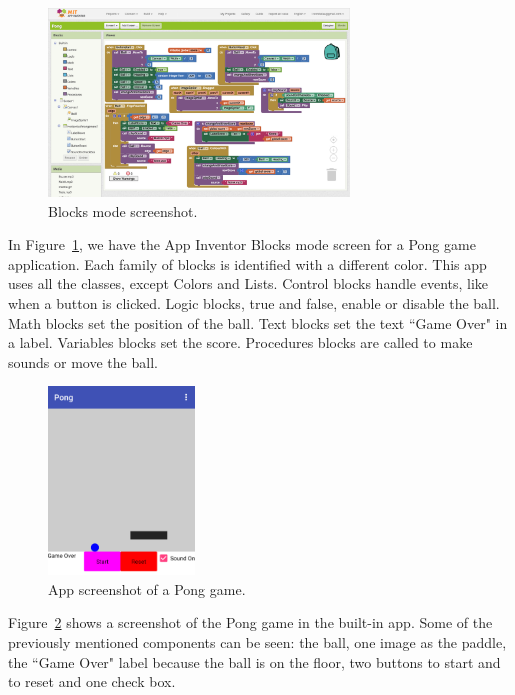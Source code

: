 \documentclass[a4paper]{article}
\begin{document}
\begin{figure}
\begin{center}
\includegraphics[height=5cm]{blocks-example}
\caption{Blocks mode screenshot.}
\label{fig:blocks-example}
\end{center}
\end{figure}

In Figure~\ref{fig:blocks-example}, we have the App Inventor Blocks mode screen for a Pong game application. Each family of blocks is identified with a different color. This app uses all the classes, except Colors and Lists. Control blocks handle events, like when a button is clicked. Logic blocks, true and false, enable or disable the ball. Math blocks set the position of the ball. Text blocks set the text ``Game Over" in a label. Variables blocks set the score. Procedures blocks are called to make sounds or move the ball.

\begin{figure}
\begin{center}
\includegraphics[height=5cm]{app-screen}
\caption{App screenshot of a Pong game.}
\label{fig:app-example}
\end{center}
\end{figure}

Figure~\ref{fig:app-example} shows a screenshot of the Pong game in the built-in app. Some of the previously mentioned components can be seen: the ball, one image as the paddle, the ``Game Over" label because the ball is on the floor, two buttons to start and to reset and one check box.
\end{document}
